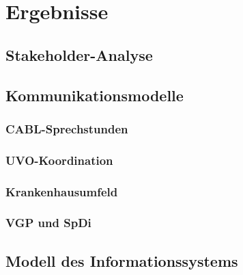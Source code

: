 \chapter{Ergebnisse}\label{ch:results}

\section{Stakeholder-Analyse}


\section{Kommunikationsmodelle}


\subsection{CABL-Sprechstunden}

\subsection{UVO-Koordination}

\subsection{Krankenhausumfeld}

\subsection{VGP und SpDi}


\section{Modell des Informationssystems}
